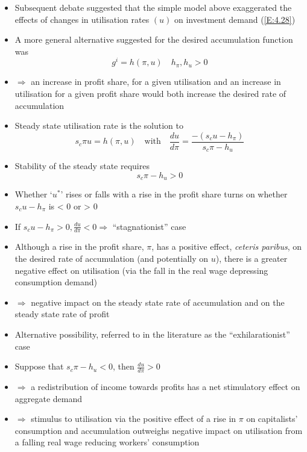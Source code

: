 \documentclass[a4paper,twoside]{article}
\numberwithin{equation}{section}
\numberwithin{figure}{section}
\begin{document}
\begin{itemize}
		\item Subsequent debate suggested that the simple model above exaggerated the effects of changes in utilisation rates \( (u) \) on investment demand (\cref{E:4.28}) 
		\item A more general alternative suggested for the desired accumulation function was
		\begin{equation}
			g^i = h(\pi,u) \quad h_{\pi},h_u>0 \label{E:4.32}
		\end{equation}
		\item \( \Rightarrow \) an increase in profit share, for a given utilisation and an increase in utilisation for a given profit share would both increase the desired rate of accumulation
		\item  Steady state utilisation rate is the solution to
		\begin{equation}
			s_c\pi u = h(\pi,u) \quad\text{with}\quad \frac{du}{d\pi} = \frac{-\left( s_cu-h_{\pi} \right)}{s_c\pi-h_u} \label{E:4.33}
		\end{equation}
		\item Stability of the steady state requires
		\[
			s_c\pi-h_u>0
		\]
		\item Whether `\( u^* \)' rises or falls with a rise in the profit share turns on whether \( s_c u-h_{\pi} \) is < 0 or > 0
		\item If \( s_c u-h_{\pi} > 0, \frac{du}{d\pi}<0 \Rightarrow \) ``stagnationist'' case
		\item Although a rise in the profit share, \( \pi \), has a positive effect, \textit{ceteris paribus}, on the desired rate of accumulation (and potentially on \( u \)), there is a greater negative effect on utilisation (via the fall in the real wage depressing consumption demand)
		\item \( \Rightarrow \) negative impact on the steady state rate of accumulation and on the steady state rate of profit
		\item Alternative possibility, referred to in the literature as the ``exhilarationist'' case
		\item Suppose that \( s_c\pi-h_u<0 \), then \( \frac{du}{d\pi}>0 \)
		\item \( \Rightarrow \) a redistribution of income towards profits has a net stimulatory effect on aggregate demand
		\item \( \Rightarrow \) stimulus to utilisation via the positive effect of a rise in \( \pi \) on capitalists' consumption and accumulation outweighs negative impact on utilisation from a falling real wage reducing workers' consumption

\end{itemize}
\end{document}
